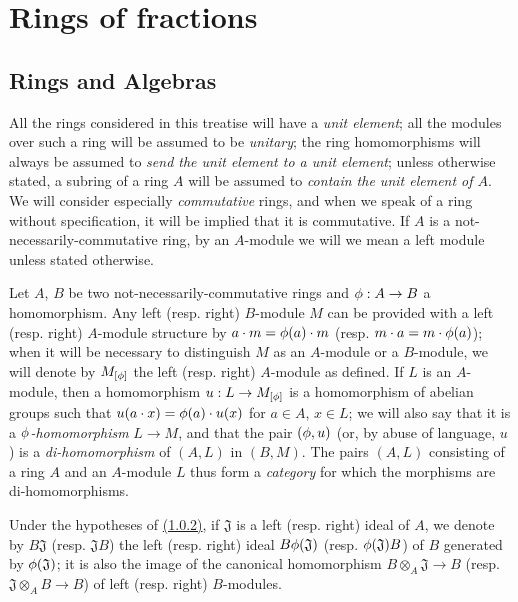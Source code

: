 \section{Rings of fractions}
\label{section-rings-of-fractions}

\setcounter{subsection}{-1}
\subsection{Rings and Algebras}
\label{subsection-rings-and-algs}

\begin{env}[1.0.1]
\label{env-0.1.0.1}
All the rings considered in this treatise will have a {\em unit element}; all
the modules over such a ring will be assumed to be {\em unitary}; the ring
homomorphisms will always be assumed to {\em send the unit element to a unit
element}; unless otherwise stated, a subring of a ring $A$ will be assumed to
{\em contain the unit element of $A$}. We will consider especially
{\em commutative} rings, and when we speak of a ring without specification, it
will be implied that it is commutative. If $A$ is a not-necessarily-commutative ring,
by an $A$-module we will we mean a left module unless stated otherwise.
\end{env}

\begin{env}[1.0.2]
\label{env-0.1.0.2}
Let $A$, $B$ be two not-necessarily-commutative rings and $\phi:A\to B$ a
homomorphism. Any left (resp. right) $B$-module $M$ can be provided with a left
(resp. right) $A$-module structure by $a\cdot m=\phi(a)\cdot m$
(resp. $m\cdot a=m\cdot\phi(a)$); when it will be necessary to distinguish $M$
as an $A$-module or a $B$-module, we will denote by $M_{[\phi]}$ the left
(resp. right) $A$-module as defined. If $L$ is an $A$-module, then a
homomorphism $u:L\to M_{[\phi]}$ is a homomorphism of abelian groups such
that $u(a\cdot x)=\phi(a)\cdot u(x)$ for $a\in A$, $x\in L$; we will also say
that it is a {\em $\phi$-homomorphism} $L\to M$, and that the pair $(\phi,u)$
(or, by abuse of language, $u$) is a {\em di-homomorphism} of $(A,L)$ in
$(B,M)$. The pairs $(A,L)$ consisting of a ring $A$ and an $A$-module $L$ thus
form a {\em category} for which the morphisms are di-homomorphisms.
\end{env}

\begin{env}[1.0.3]
\label{env-0.1.0.3}
Under the hypotheses of \hyperref[env-0.1.0.2]{(1.0.2)}, if $\mathfrak{J}$ is a left
(resp. right) ideal of $A$, we denote by $B\mathfrak{J}$ (resp. $\mathfrak{J}B$)
the left (resp. right) ideal $B\phi(\mathfrak{J})$
(resp. $\phi(\mathfrak{J})B$) of $B$ generated by $\phi(\mathfrak{J})$; it is
also the image of the canonical homomorphism $B\otimes_A\mathfrak{J}\to B$
(resp. $\mathfrak{J}\otimes_A B\to B$) of left (resp. right) $B$-modules.
\end{env}

